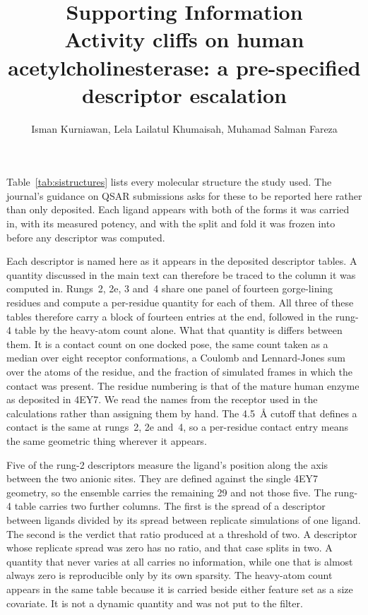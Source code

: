 \documentclass[letterpaper]{article}
\title{Supporting Information\\
  Activity cliffs on human acetylcholinesterase:
  a pre-specified descriptor escalation}
\author{Isman Kurniawan, Lela Lailatul Khumaisah, Muhamad Salman Fareza}
\date{}
\begin{document}
\maketitle

Table~\ref{tab:sistructures} lists every molecular structure the study used. The
journal's guidance on QSAR submissions asks for these to be reported here rather than
only deposited. Each ligand appears with both of the forms it was carried in, with its
measured potency, and with the split and fold it was frozen into before any descriptor
was computed.

\footnotesize

\normalsize

\clearpage

Each descriptor is named here as it appears in the deposited descriptor tables. A
quantity discussed in the main text can therefore be traced to the column it was
computed in. Rungs~2, 2e, 3 and~4 share one panel of fourteen gorge-lining residues and
compute a per-residue quantity for each of them. All three of these tables therefore
carry a block of fourteen entries at the end, followed in the rung-4 table by the
heavy-atom count alone. What that quantity is differs between them. It is
a contact count on one docked pose, the same count taken as a median over eight
receptor conformations, a Coulomb and Lennard-Jones sum over the atoms of the residue,
and the fraction of simulated frames in which the contact was present. The residue
numbering is that of the mature human enzyme as deposited in 4EY7. We read the names
from the receptor used in the calculations rather than assigning them by hand. The
\SI{4.5}{\angstrom} cutoff that defines a contact is the same at rungs~2, 2e and~4, so
a per-residue contact entry means the same geometric thing wherever it appears.

Five of the rung-2 descriptors measure the ligand's position along the axis between
the two anionic sites. They are defined against the single 4EY7 geometry, so the
ensemble carries the remaining 29 and not those five. The rung-4 table carries two
further columns. The first is the spread of a descriptor between ligands divided by its
spread between replicate simulations of one ligand. The second is the verdict that
ratio produced at a threshold of two. A descriptor whose replicate spread was zero has
no ratio, and that case splits in two. A quantity that never varies at all carries no
information, while one that is almost always zero is reproducible only by its own
sparsity. The heavy-atom count appears in the same table because it is carried beside
either feature set as a size covariate. It is not a dynamic quantity and was not put to
the filter.
\end{document}
